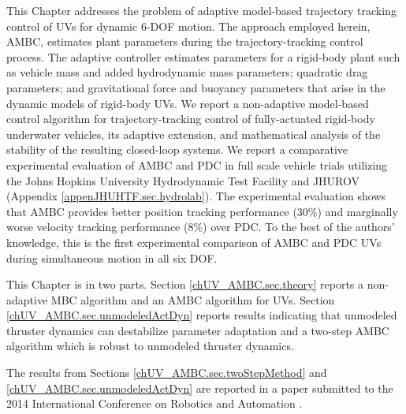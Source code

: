 

This Chapter addresses the problem of adaptive model-based trajectory
tracking control of \acp{UV} for dynamic 6-\ac{DOF} motion.
%
The approach employed herein, \ac{AMBC}, estimates plant parameters
during the trajectory-tracking control process.
%
The adaptive controller estimates parameters for a rigid-body plant
such as vehicle mass and added hydrodynamic mass parameters; quadratic
drag parameters; and gravitational force and buoyancy parameters that
arise in the dynamic models of rigid-body \acp{UV}.
%
We report a non-adaptive model-based control algorithm for
trajectory-tracking control of fully-actuated rigid-body underwater
vehicles, its adaptive extension, and mathematical analysis of the
stability of the resulting closed-loop systems.
%
We report a comparative experimental evaluation of \ac{AMBC} and
\ac{PDC} in full scale vehicle trials utilizing the Johns Hopkins
University Hydrodynamic Test Facility and \ac{JHUROV} (Appendix
\ref{appenJHUHTF.sec.hydrolab}).
%
The experimental evaluation shows that \ac{AMBC} provides better
position tracking performance (30\%) and marginally worse velocity
tracking performance (8\%) over \ac{PDC}.
%
To the best of the authors' knowledge, this is the first experimental
comparison of \ac{AMBC} and \ac{PDC} \acp{UV} during simultaneous
motion in all six \ac{DOF}.


This Chapter is in two parts. 
%
Section \ref{chUV_AMBC.sec.theory} reports a non-adaptive \ac{MBC} algorithm and
an \ac{AMBC} algorithm for \acp{UV}.
%
Section \ref{chUV_AMBC.sec.unmodeledActDyn} reports results indicating 
that unmodeled thruster dynamics can destabilize parameter
adaptation and a two-step \ac{AMBC} algorithm which is robust to 
unmodeled thruster dynamics. 


The results from Sections \ref{chUV_AMBC.sec.twoStepMethod} and
\ref{chUV_AMBC.sec.unmodeledActDyn} are reported in a paper submitted
to the 2014 International Conference on Robotics and Automation
\cite{mcfarland.icra2014}.




